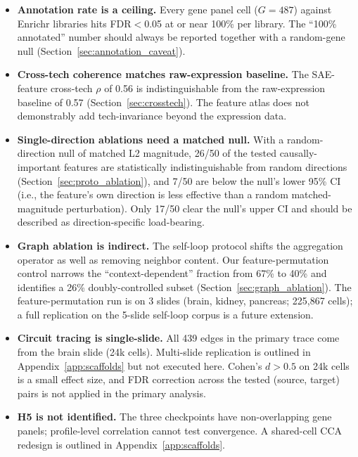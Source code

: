\documentclass[11pt]{article}
\begin{document}
\begin{itemize}
\item \textbf{Annotation rate is a ceiling.} Every gene panel cell
      ($G = 487$) against Enrichr libraries hits FDR$<$0.05 at or near
      100\% per library. The ``100\% annotated'' number should always
      be reported together with a random-gene null
      (Section~\ref{sec:annotation_caveat}).
\item \textbf{Cross-tech coherence matches raw-expression baseline.}
      The SAE-feature cross-tech $\rho$ of 0.56 is indistinguishable
      from the raw-expression baseline of 0.57
      (Section~\ref{sec:crosstech}). The feature atlas does
      not demonstrably add tech-invariance beyond the expression data.
\item \textbf{Single-direction ablations need a matched null.} With a
      random-direction null of matched L2 magnitude, 26/50 of the
      tested causally-important features are statistically
      indistinguishable from random directions
      (Section~\ref{sec:proto_ablation}), and 7/50 are below
      the null's lower 95\% CI (i.e., the feature's own direction is
      less effective than a random matched-magnitude perturbation).
      Only 17/50 clear the null's upper CI and should be described as
      direction-specific load-bearing.
\item \textbf{Graph ablation is indirect.} The self-loop protocol
      shifts the aggregation operator as well as removing neighbor
      content. Our feature-permutation control narrows the
      ``context-dependent'' fraction from 67\% to 40\% and identifies
      a 26\% doubly-controlled subset
      (Section~\ref{sec:graph_ablation}). The feature-permutation run
      is on 3 slides (brain, kidney, pancreas; 225{,}867 cells); a
      full replication on the 5-slide self-loop corpus is a future
      extension.
\item \textbf{Circuit tracing is single-slide.} All 439 edges in the
      primary trace come from the brain slide (24k cells). Multi-slide
      replication is outlined in Appendix~\ref{app:scaffolds} but not
      executed here. Cohen's $d > 0.5$ on 24k cells is a small effect
      size, and FDR correction across the tested (source, target)
      pairs is not applied in the primary analysis.
\item \textbf{H5 is not identified.} The three checkpoints have
      non-overlapping gene panels; profile-level correlation cannot
      test convergence. A shared-cell CCA redesign is outlined in
      Appendix~\ref{app:scaffolds}.

\end{itemize}
\end{document}
